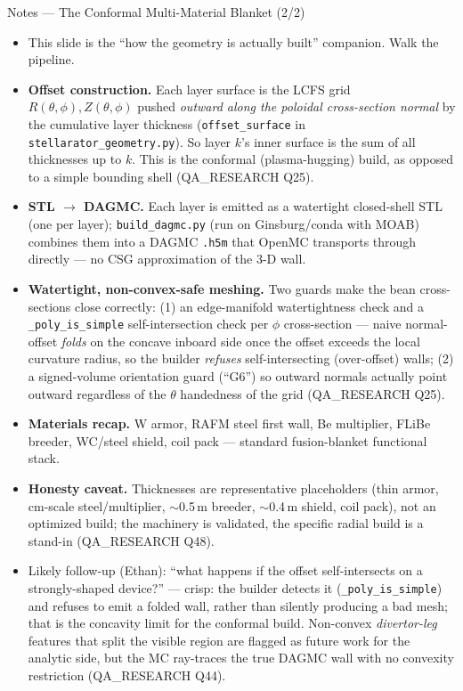 \documentclass[11pt,aspectratio=169]{beamer}
\begin{document}
\begin{frame}[allowframebreaks]{Notes --- The Conformal Multi-Material Blanket (2/2)}
{\color{red}\footnotesize
\begin{itemize}
\item This slide is the ``how the geometry is actually built'' companion. Walk the pipeline.
\item \textbf{Offset construction.} Each layer surface is the LCFS grid $R(\theta,\phi),Z(\theta,\phi)$
      pushed \emph{outward along the poloidal cross-section normal} by the cumulative layer thickness
      (\texttt{offset\_surface} in \texttt{stellarator\_geometry.py}). So layer $k$'s inner surface is
      the sum of all thicknesses up to $k$. This is the conformal (plasma-hugging) build, as opposed
      to a simple bounding shell (QA\_RESEARCH Q25).
\item \textbf{STL $\to$ DAGMC.} Each layer is emitted as a watertight closed-shell STL (one per
      layer); \texttt{build\_dagmc.py} (run on Ginsburg/conda with MOAB) combines them into a DAGMC
      \texttt{.h5m} that OpenMC transports through directly --- no CSG approximation of the 3-D wall.
\item \textbf{Watertight, non-convex-safe meshing.} Two guards make the bean cross-sections close
      correctly: (1) an edge-manifold watertightness check and a \texttt{\_poly\_is\_simple}
      self-intersection check per $\phi$ cross-section --- naive normal-offset \emph{folds} on the
      concave inboard side once the offset exceeds the local curvature radius, so the builder
      \emph{refuses} self-intersecting (over-offset) walls; (2) a signed-volume orientation guard
      (``G6'') so outward normals actually point outward regardless of the $\theta$ handedness of the
      grid (QA\_RESEARCH Q25).
\item \textbf{Materials recap.} W armor, RAFM steel first wall, Be multiplier, FLiBe breeder,
      WC/steel shield, coil pack --- standard fusion-blanket functional stack.
\item \textbf{Honesty caveat.} Thicknesses are representative placeholders (thin armor, cm-scale
      steel/multiplier, $\sim$0.5\,m breeder, $\sim$0.4\,m shield, coil pack), not an optimized
      build; the machinery is validated, the specific radial build is a stand-in (QA\_RESEARCH Q48).
\item Likely follow-up (Ethan): ``what happens if the offset self-intersects on a strongly-shaped
      device?'' --- crisp: the builder detects it (\texttt{\_poly\_is\_simple}) and refuses to emit a
      folded wall, rather than silently producing a bad mesh; that is the concavity limit for the
      conformal build. Non-convex \emph{divertor-leg} features that split the visible region are
      flagged as future work for the analytic side, but the MC ray-traces the true DAGMC wall with no
      convexity restriction (QA\_RESEARCH Q44).
\end{itemize}
}
\end{frame}
\end{document}
